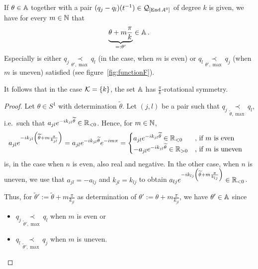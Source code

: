 \begin{lem}\label{lem:rotationalSym}%
  If $\theta\in\mathbb{A}$ together with a pair $(q_j-q_l)(t^{-1})\in\mathcal{Q}_{[\operatorname{End} A^0]}$
  of degree $k$ is given, we have for every $m\in\mathbb{N}$ that
  \[
    \underset{=:\theta'}{\underbrace{\theta+m\frac{\pi}{k}}} \in \mathbb{A} \,.
  \]
  Especially is either $q_j \underset{\theta',\max}{\prec} q_l$ (in the
  case, when $m$ is even) or $q_l \underset{\theta',\max}{\prec} q_j$
  (when $m$ is uneven) satisfied (see figure~\ref{fig:functionF}).
  \begin{s-cor}
    It follows that in the case $\mathcal{K}=\{k\}$, the set $\mathbb{A}$ has
    $\frac{\pi}{k}$-rotational symmetry.
  \end{s-cor}
\end{lem}
\begin{proof}
  Let $\theta\in S^1$ with determination $\tilde\theta$.
  Let $(j,l)$ be a pair such that
  $q_j \underset{\tilde\theta,\max}{\prec} q_l$, i.e.\ such that
  $a_{jl}e^{-ik_{jl}\widetilde\theta}\in\mathbb{R}_{<0}$.
  Hence, for $m\in\mathbb{N}$,
  \begin{align*}
    a_{jl}e^{-ik_{jl}\left(\widetilde\theta+m\frac{\pi}{k_{jl}}\right)}
    &=a_{jl}e^{-ik_{jl}\widetilde\theta}e^{-im\pi}
    = \begin{cases}
      a_{jl}e^{-ik_{jl}\widetilde\theta}\in\mathbb{R}_{<0}
        & \text{, if $m$ is even}
    \\-a_{jl}e^{-ik_{jl}\widetilde\theta}\in\mathbb{R}_{>0}
        & \text{, if $m$ is uneven}
    \end{cases}
  \end{align*}
  is, in the case when $n$ is even, also real and negative. In the other
  case, when $n$ is uneven, we use that $a_{jl}=-a_{lj}$ and $k_{jl}=k_{lj}$ to
  obtain
  $a_{lj}e^{-ik_{lj}\left(\widetilde\theta+m\frac{\pi}{k_{lj}}\right)} \in\mathbb{R}_{<0}$.

  Thus, for $\tilde\theta':=\tilde\theta+m\frac{\pi}{k_{jl}}$ as determination
  of $\theta':=\theta+m\frac{\pi}{k_{jl}}$, we have $\theta'\in\mathbb{A}$ since
  \begin{itemize}
    \item $q_j \underset{\tilde\theta',\max}{\prec} q_l$ when $m$ is even or
    \item $q_l \underset{\tilde\theta',\max}{\prec} q_j$ when $m$ is uneven.
  \end{itemize}
\end{proof}

